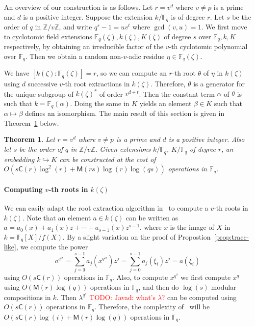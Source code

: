 \documentclass[12pt]{article}
\theoremstyle{plain}
\newtheorem{theorem}{Theorem}
\theoremstyle{definition}
\newcommand{\todo}[1]{\textcolor{red}{TODO: #1}}
\def\Z{\ensuremath{\mathbb{Z}}}
\def\F{\ensuremath{\mathbb{F}}}
\def\MM{\ensuremath{\mathsf{M}}}
\def\CC{\ensuremath{\mathsf{C}}}
\newcounter{algorithm}
\begin{document}
An overview of our construction is as follows. Let $r = v^d$ where $v \ne p$ is a 
prime and $d$ is a positive integer. Suppose the extension $k/\F_q$ is of degree $r$. Let $s$ be 
the order of $q$ in $\Z / v\Z$, and write $q^s - 1 = uv^t$ where $\gcd(v, u) = 1$. We first move to 
cyclotomic field extensions $\F_q(\zeta), k(\zeta), K(\zeta)$ of degree $s$ over $\F_q, k, K$ respectively, by 
obtaining an irreducible factor of the $v$-th cyclotomic polynomial over $\F_q$. Then we obtain a  
random non-$v$-adic residue $\eta \in \F_q(\zeta)$.

We have $[k(\zeta): \F_q(\zeta)] = r$, so we can 
compute an $r$-th root $\theta$ of $\eta$ in $k(\zeta)$ using $d$ successive $v$-th 
root extractions in $k(\zeta)$. Therefore, $\theta$ is a generator for the unique subgroup of 
$k(\zeta)^*$ of order $v^{d + t}$. Then the constant term $\alpha$ of $\theta$ is such that $k = 
\F_q(\alpha)$. %
Doing the same in $K$ yields an element $\beta\in K$ such that
$\alpha\mapsto\beta$ defines an isomorphism. %
The main result of this section is given in Theorem~\ref{theorem:isom-root} below.

\begin{theorem}
	\label{theorem:isom-root}
	Let $r = v^d$ where $v \ne p$ is a prime and $d$ is a positive integer. Also let $s$ be the 
	order of $q$ in $\Z / v\Z$. Given extensions $k/\F_q$, $K/\F_q$ of degree $r$, an
        embedding $k\hookrightarrow K$ can be constructed at the cost of 
	$O(s\CC(r)\log^2(r) + \MM(rs)\log(r)\log(qs))$ operations in $\F_q$.
\end{theorem}


\paragraph{Computing $v$-th roots in $k(\zeta)$}
We can easily adapt the root extraction algorithm in~\cite{doliskanischost2011} to compute a $v$-th 
roots in $k(\zeta)$. Note that an element $a \in k(\zeta)$ can be written as $a = a_0(x) + a_1(x)z 
+ \cdots + a_{s - 	1}(x)z^{s - 1}$, 
where $x$ is the image of $X$ in $k=\F_q[X]/f(X)$.
By a slight variation on the proof of Propostion~\ref{prop:trace-like}, we compute the power
\[a^{q^{is}} = \sum_{j = 0}^{s - 1} a_j(x^{q^{is}})z^j = \sum_{j = 0}^{s - 1} a_j(\xi_i)z^j = 
a(\xi_i)\]
using $O(s\CC(r))$ operations in $\F_q$. Also, to compute $x^{q^s}$ we first compute 
$x^q$ using $O(\MM(r)\log(q))$ operations in $\F_q$, and then do $\log(s)$ modular compositions in 
$k$. Then $\lambda^{q^s}$ \todo{Javad: what's $\lambda$?} can be computed using $O(s\CC(r))$ operations in $\F_q$. Therefore, the 
complexity of~\cite[Algorithm~2]{doliskanischost2011} will be $O(s\CC(r)\log(i) + 
\MM(r)\log(q))$ operations in $\F_q$.
\end{document}
